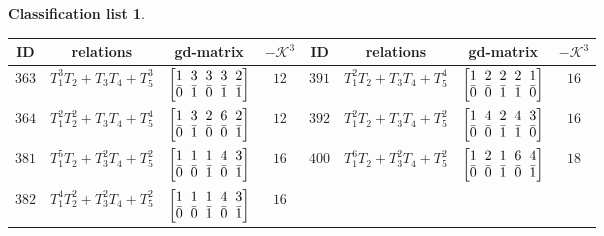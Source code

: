 \documentclass[pdftex]{sigma}%
\theoremstyle{definition}
\newtheorem{class-list}[thm]{Classification list}
\numberwithin{equation}{section}
\begin{document}
\begin{class-list}
\begin{table}[h!]\centering\setlength{\tabcolsep}{3.5pt}
\renewcommand{\arraystretch}{1.3}\small\tabulinesep=1mm
\begin{tabu}{c|c|c|c||c|c|c|c}
\hline
ID&relations&gd-matrix&$-\mathcal{K}^3$&ID&relations&gd-matrix&$-\mathcal{K}^3$
\\
\hline
${363}$&${T_{1}^{3}T_{2}+T_{3}T_{4}+T_{5}^{3}}$
&$\arraycolsep=1mm\begin{bmatrix}{1} & {3} & {3} & {3} & {2} \\ {\bar{0}} & {\bar{1}} & {\bar{0}} & {\bar{1}} & {\bar{1}}\end{bmatrix}$&${12}$
&${391}$&${T_{1}^{2}T_{2}+T_{3}T_{4}+T_{5}^{4}}$
&$\arraycolsep=1mm\begin{bmatrix}{1} & {2} & {2} & {2} & {1} \\ {\bar{0}} & {\bar{0}} & {\bar{1}} & {\bar{1}} & {\bar{0}}\end{bmatrix}$&${16}$
\\
\hline
${364}$&${T_{1}^{2}T_{2}^{2}+T_{3}T_{4}+T_{5}^{4}}$
&$\arraycolsep=1mm\begin{bmatrix}{1} & {3} & {2} & {6} & {2} \\ {\bar{0}} & {\bar{1}} & {\bar{0}} & {\bar{0}} & {\bar{1}}\end{bmatrix}$&${12}$
&${392}$&${T_{1}^{2}T_{2}+T_{3}T_{4}+T_{5}^{2}}$
&$\arraycolsep=1mm\begin{bmatrix}{1} & {4} & {2} & {4} & {3} \\ {\bar{0}} & {\bar{0}} & {\bar{1}} & {\bar{1}} & {\bar{0}}\end{bmatrix}$&${16}$
\\
\hline
${381}$&${T_{1}^{5}T_{2}+T_{3}^{2}T_{4}+T_{5}^{2}}$
&$\arraycolsep=1mm\begin{bmatrix}{1} & {1} & {1} & {4} & {3} \\ {\bar{0}} & {\bar{0}} & {\bar{1}} & {\bar{0}} & {\bar{1}}\end{bmatrix}$&${16}$
&${400}$&${T_{1}^{6}T_{2}+T_{3}^{2}T_{4}+T_{5}^{2}}$
&$\arraycolsep=1mm\begin{bmatrix}{1} & {2} & {1} & {6} & {4} \\ {\bar{0}} & {\bar{0}} & {\bar{1}} & {\bar{0}} & {\bar{1}}\end{bmatrix}$&${18}$
\\
\hline
${382}$&${T_{1}^{4}T_{2}^{2}+T_{3}^{2}T_{4}+T_{5}^{2}}$
&$\arraycolsep=1mm\begin{bmatrix}{1} & {1} & {1} & {4} & {3} \\ {\bar{0}} & {\bar{0}} & {\bar{1}} & {\bar{0}} & {\bar{1}}\end{bmatrix}$&${16}$

\end{tabu}
\end{table}
\end{class-list}
\end{document}
